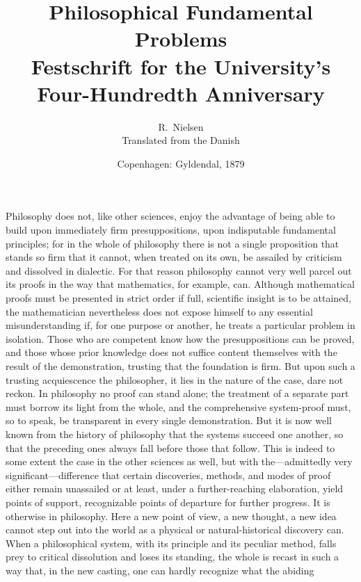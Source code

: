 \documentclass[12pt]{article}
\title{\textbf{Philosophical Fundamental Problems}\\[0.5em]
  \large Festschrift for the University's Four-Hundredth Anniversary}
\author{R.\ Nielsen\\[4pt]\small Translated from the Danish}
\date{Copenhagen: Gyldendal, 1879}
\begin{document}
\maketitle



\noindent
Philosophy does not, like other sciences, enjoy the advantage of
being able to build upon immediately firm presuppositions, upon
indisputable fundamental principles; for in the whole of philosophy
there is not a single proposition that stands so firm that it cannot,
when treated on its own, be assailed by criticism and dissolved in
dialectic. For that reason philosophy cannot very well parcel out its
proofs in the way that mathematics, for example, can. Although
mathematical proofs must be presented in strict order if full,
scientific insight is to be attained, the mathematician nevertheless
does not expose himself to any essential misunderstanding if, for one
purpose or another, he treats a particular problem in isolation. Those
who are competent know how the presuppositions can be proved, and those
whose prior knowledge does not suffice content themselves with the
result of the demonstration, trusting that the foundation is firm. But
upon such a trusting acquiescence the philosopher, it lies in the nature
of the case, dare not reckon. In philosophy no proof can stand alone;
the treatment of a separate part must borrow its light from the whole,
and the comprehensive system-proof must, so to speak, be transparent in
every single demonstration. But it is now well known from the history of
philosophy that the systems succeed one another, so that the preceding
ones always fall before those that follow. This is indeed to some extent
the case in the other sciences as well, but with the—admittedly very
significant—difference that certain discoveries, methods, and modes of
proof either remain unassailed or at least, under a further-reaching
elaboration, yield points of support, recognizable points of departure
for further progress. It is otherwise in philosophy. Here a new point of
view, a new thought, a new idea cannot step out into the world as a
physical or natural-historical discovery can. When a philosophical
system, with its principle and its peculiar method, falls prey to
critical dissolution and loses its standing, the whole is recast in such
a way that, in the new casting, one can hardly recognize what the abiding
\end{document}
